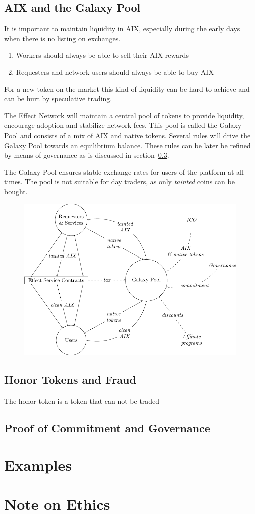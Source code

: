 \documentclass{article}
\begin{document}
\subsection{AIX and the Galaxy Pool}
It is important to maintain liquidity in AIX, especially during the
early days when there is no listing on exchanges. 

\begin{enumerate}
\item Workers should always be able to sell their AIX rewards
\item Requesters and network users should always be able to buy AIX
\end{enumerate}

For a new token on the market this kind of liquidity can be hard to
achieve and can be hurt by speculative trading.

The Effect Network will maintain a central pool of tokens to provide
liquidity, encourage adoption and stabilize network fees. This pool is
called the Galaxy Pool and consists of a mix of AIX and native
tokens. Several rules will drive the Galaxy Pool towards an
equilibrium balance. These rules can be later be refined by means of
governance as is discussed in section~\ref{sec:governance}.

The Galaxy Pool ensures stable exchange rates for users of the
platform at all times. The pool is not suitable for day traders, as
only \emph{tainted} coins can be bought.
\begin{figure}[htb]
\includegraphics[width=\textwidth]{pictures/galaxy.pdf}
\end{figure}

\subsection{Honor Tokens and Fraud}
The honor token is a token that can not be traded

\subsection{Proof of Commitment and Governance}
\label{sec:governance}

\section{Examples}

\section{Note on Ethics}
\end{document}
